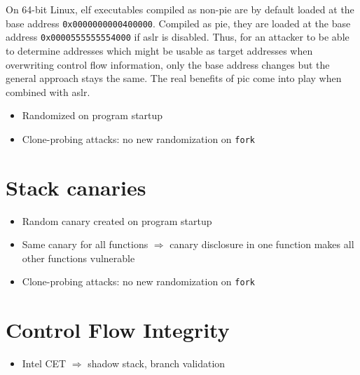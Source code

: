 On 64-bit Linux, \gls{elf} executables compiled as non-\acrshort{pie} are by default loaded at the base address \texttt{0x0000000000400000}.
Compiled as \gls{pie}, they are loaded at the base address \texttt{0x0000555555554000} if \gls{aslr} is disabled.
Thus, for an attacker to be able to determine addresses which might be usable as target addresses when overwriting control flow information, only the base address changes but the general approach stays the same.
The real benefits of \gls{pic} come into play when combined with \gls{aslr}.

\begin{itemize}
	\item{Randomized on program startup}
	\item{Clone-probing attacks: no new randomization on \texttt{fork}}
\end{itemize}

\section{Stack canaries}
\label{sec:stack-canaries}

\begin{itemize}
	\item{Random canary created on program startup}
	\item{Same canary for all functions $\Rightarrow$ canary disclosure in one function makes all other functions vulnerable}
	\item{Clone-probing attacks: no new randomization on \texttt{fork}}
\end{itemize}

\section{Control Flow Integrity}
\label{sec:cfi}

\begin{itemize}
	\item{Intel CET $\Rightarrow$ shadow stack, branch validation}
\end{itemize}